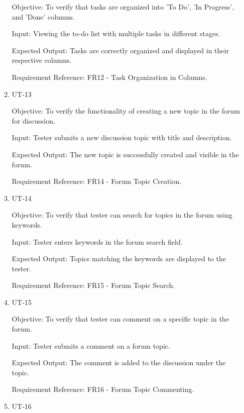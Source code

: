 \documentclass[12pt, titlepage]{article}
\begin{document}
\begin{enumerate}
\begin{enumerate}
        Objective: To verify that tasks are organized into 'To Do', 'In Progress', and 'Done' columns.
        
        Input: Viewing the to-do list with multiple tasks in different stages.
        
        Expected Output: Tasks are correctly organized and displayed in their respective columns.
        
        Requirement Reference: FR12 - Task Organization in Columns.

    \item{UT-13\\}\label{UT-13}
    
        Objective: To verify the functionality of creating a new topic in the forum for discussion.
        
        Input: Tester submits a new discussion topic with title and description.
        
        Expected Output: The new topic is successfully created and visible in the forum.
        
        Requirement Reference: FR14 - Forum Topic Creation.
        
    \item{UT-14\\}\label{UT-14}
    
        Objective: To verify that tester can search for topics in the forum using keywords.
        
        Input: Tester enters keywords in the forum search field.
        
        Expected Output: Topics matching the keywords are displayed to the tester.
        
        Requirement Reference: FR15 - Forum Topic Search.
        
    \item{UT-15\\}\label{UT-15}
    
        Objective: To verify that tester can comment on a specific topic in the forum.
        
        Input: Tester submits a comment on a forum topic.
        
        Expected Output: The comment is added to the discussion under the topic.
        
        Requirement Reference: FR16 - Forum Topic Commenting.
        
    \item{UT-16\\}\label{UT-16}
    

\end{enumerate}
\end{enumerate}
\end{document}
